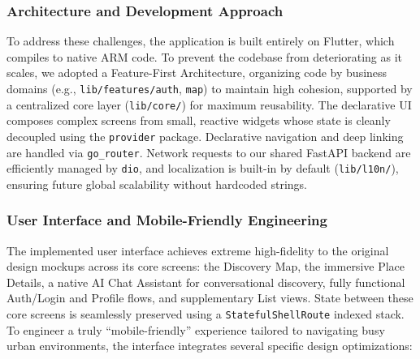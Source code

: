 \documentclass[conference]{IEEEtran}
\begin{document}
\subsubsection{Architecture and Development Approach}
To address these challenges, the application is built entirely on Flutter, which compiles to native ARM code. To prevent the codebase from deteriorating as it scales, we adopted a Feature-First Architecture, organizing code by business domains (e.g., \texttt{lib/features/auth}, \texttt{map}) to maintain high cohesion, supported by a centralized core layer (\texttt{lib/core/}) for maximum reusability. The declarative UI composes complex screens from small, reactive widgets whose state is cleanly decoupled using the \texttt{provider} package. Declarative navigation and deep linking are handled via \texttt{go\_router}. Network requests to our shared FastAPI backend are efficiently managed by \texttt{dio}, and localization is built-in by default (\texttt{lib/l10n/}), ensuring future global scalability without hardcoded strings.

\subsubsection{User Interface and Mobile-Friendly Engineering}
The implemented user interface achieves extreme high-fidelity to the original design mockups across its core screens: the Discovery Map, the immersive Place Details, a native AI Chat Assistant for conversational discovery, fully functional Auth/Login and Profile flows, and supplementary List views. State between these core screens is seamlessly preserved using a \texttt{Stateful\allowbreak Shell\allowbreak Route} indexed stack. To engineer a truly ``mobile-friendly'' experience tailored to navigating busy urban environments, the interface integrates several specific design optimizations: 
\end{document}
